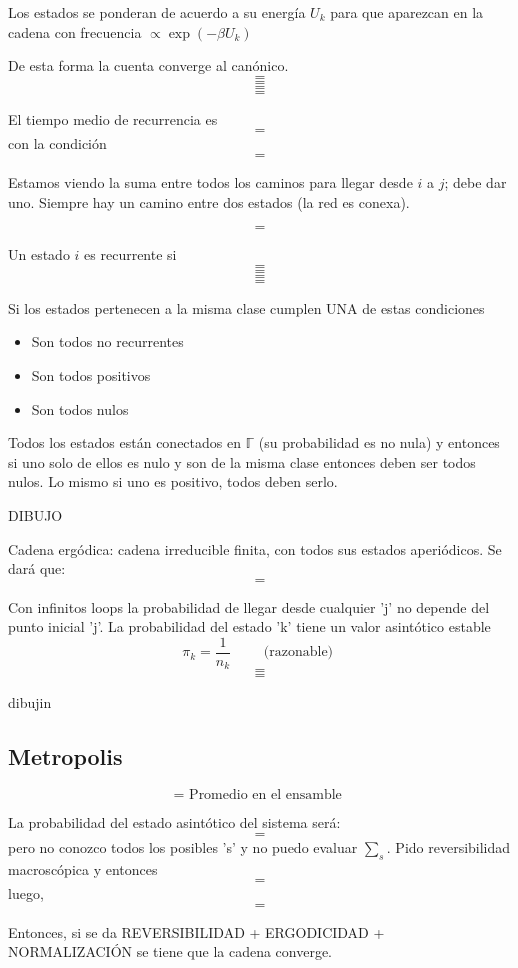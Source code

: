 \documentclass[10pt,oneside]{CBFT_book}
\begin{document}
Los estados se ponderan de acuerdo a su energía $U_k$ para que aparezcan en la cadena con frecuencia
$ \propto \exp(-\beta U_k ) $

De esta forma la cuenta converge al canónico.
\[=\]
\[=\]
\[=\]
\[=\]

El tiempo medio de recurrencia es
\[=\]
con la condición 
\[=\]

Estamos viendo la suma entre todos los caminos para llegar desde $i$ a $j$; debe dar uno.
Siempre hay un camino entre dos estados (la red es conexa).

\[=\]

Un estado $i$ es recurrente si 
\[=\]
\[=\]
\[=\]
\[=\]


Si los estados pertenecen a la misma clase cumplen UNA de estas condiciones 
\begin{itemize}
 \item Son todos no recurrentes
 \item Son todos positivos
 \item Son todos nulos
\end{itemize}

Todos los estados están conectados en $ \mathbb{\Gamma} $  (su probabilidad es no nula) y entonces
si uno solo de ellos es nulo y son de la misma clase entonces deben ser todos nulos.
Lo mismo si uno es positivo, todos deben serlo.

DIBUJO 

Cadena ergódica: cadena irreducible finita, con todos sus estados aperiódicos. 
Se dará que:
\[=\]

Con infinitos loops la probabilidad de llegar desde cualquier 'j' no depende del punto inicial 'j'.
La probabilidad del estado 'k' tiene un valor asintótico estable
\[
	\pi_k = \frac{1}{n_k} \qquad \text{ (razonable) } 
\]
\[=\]
\[=\]

dibujin

\subsection{Metropolis}

\[= \text{ Promedio en el ensamble } \]

La probabilidad del estado asintótico del sistema será:
\[=\]
pero no conozco todos los posibles 's' y no puedo evaluar $\sum_s$.
Pido reversibilidad macroscópica y entonces
\[=\]
luego,
\[=\]

Entonces, si se da 
REVERSIBILIDAD + ERGODICIDAD + NORMALIZACIÓN
se tiene que la cadena converge.
\end{document}
